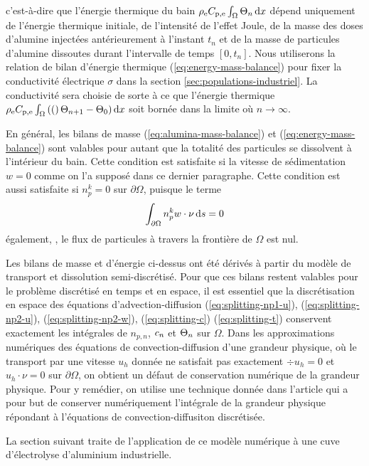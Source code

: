 c'est-à-dire que l'énergie thermique du bain
$\rho_\mathrm{e}C_{\mathrm{p,e}}\int_\Omega\Theta_{n}\,\mathrm dx$
dépend uniquement de l'énergie thermique initiale, de l'intensité de
l'effet Joule, de la masse des doses d'alumine injectées
antérieurement à l'instant $t_n$ et de la masse de particules
d'alumine dissoutes durant l'intervalle de temps $[0, t_n]$. Nous
utiliserons la relation de bilan d'énergie thermique
(\ref{eq:energy-mass-balance}) pour fixer la conductivité électrique
$\sigma$ dans la section \ref{sec:populations-industriel}. La
conductivité sera choisie de sorte à ce que l'énergie thermique
$\rho_\mathrm{e} C_{\mathrm{p,e}} \int_\Omega
\left( ( \right)\Theta_{n+1} - \Theta_0)\,\mathrm dx$ soit bornée dans
la limite où $n\to\infty$.

\begin{remarque}
  En général, les bilans de masse (\ref{eq:alumina-mass-balance}) et
  (\ref{eq:energy-mass-balance}) sont valables pour autant que la
  totalité des particules se dissolvent à l'intérieur du bain. Cette
  condition est satisfaite si la vitesse de sédimentation $ w = 0$
  comme on l'a supposé dans ce dernier paragraphe. Cette condition est
  aussi satisfaite si $n_p^k = 0$ sur $\partial \Omega$, puisque le
  terme
  \begin{equation}
    \int_{\partial \Omega} n_p^k w\cdot \nu\,\mathrm ds = 0
  \end{equation}
  également, \ie, le flux de particules à travers la frontière de
  $\Omega$ est nul.
\end{remarque}

\begin{remarque}
  Les bilans de masse et d'énergie ci-dessus ont été dérivés à partir du
  modèle de transport et dissolution semi-discrétisé. Pour que ces
  bilans restent valables pour le problème discrétisé en temps et en
  espace, il est essentiel que la discrétisation en espace des équations
  d'advection-diffusion (\ref{eq:splitting-np1-u}),
  (\ref{eq:splitting-np2-u}), (\ref{eq:splitting-np2-w}),
  (\ref{eq:splitting-c}) (\ref{eq:splitting-t}) conservent exactement
  les intégrales de $n_{p,n}$, $c_n$ et
  $\Theta_n$ sur $\Omega$. Dans les approximations numériques
  des équations de convection-diffusion d'une grandeur physique,
  où le transport par une vitesse $u_h$ donnée ne satisfait pas
  exactement  $\div u_h = 0$ et $u_h\cdot \nu = 0$ sur $\partial
  \Omega$, on obtient un défaut de conservation numérique de
  la grandeur physique. Pour y remédier, on utilise une
  technique donnée dans l'article \cite{flotron2013b}  qui a pour but
  de conserver numériquement l'intégrale de la grandeur physique
  répondant à l'équations de convection-diffusiton discrétisée.
\end{remarque}

La section suivant traite de l'application de ce modèle numérique à
une cuve d'électrolyse d'aluminium industrielle.

